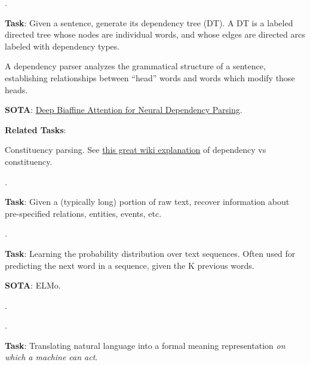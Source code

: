 \documentclass[11pt]{article}
\begin{document}
\myspace
\p {}. 
\begin{compactitem}
	\item \textbf{Task}: Given a sentence, generate its dependency tree (DT). A DT is a labeled directed tree whose nodes are individual words, and whose edges are directed arcs labeled with dependency types.  
	\begin{compactitem}
		\item A dependency parser analyzes the grammatical structure of a sentence, establishing relationships between ``head'' words and words which modify those heads.
	\end{compactitem}
	
	\item \textbf{SOTA}: \href{https://arxiv.org/abs/1611.01734}{Deep Biaffine Attention for Neural Dependency Parsing}.
	
	\textbf{Related Tasks}:
	\begin{compactitem}
		\item Constituency parsing. See \href{https://www.wikiwand.com/en/Dependency_grammar#/Dependency_vs._constituency}{this great wiki explanation} of dependency vs constituency.
	\end{compactitem}
\end{compactitem}


\myspace
\p {}. 
\begin{compactitem}
	\item \textbf{Task}: Given a (typically long) portion of raw text, recover information about pre-specified relations, entities, events, etc. 
\end{compactitem}

\myspace
\p {}.
\begin{compactitem}
	\item \textbf{Task}: Learning the probability distribution over text sequences. Often used for predicting the next word in a sequence, given the K previous words.
	
	\item \textbf{SOTA}: ELMo.
\end{compactitem}

\myspace
\p {}. 

\myspace
\p {}. 
\begin{compactitem}
	\item \textbf{Task}: Translating natural language into a formal meaning representation \textit{on which a machine can act}. 
\end{compactitem}
\end{document}
